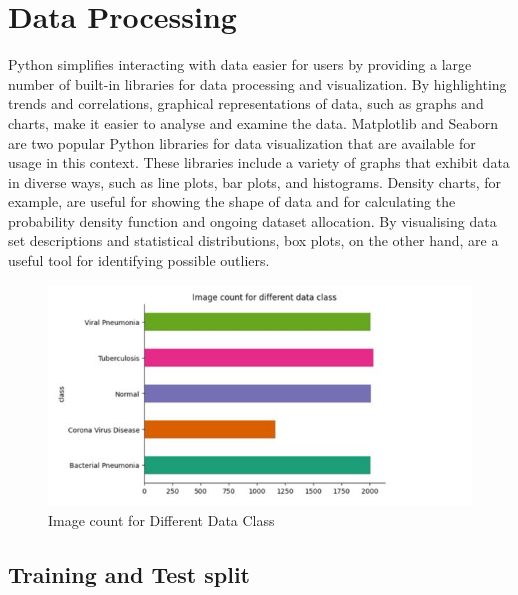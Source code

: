 \section{Data Processing}
Python simplifies interacting with data easier for users by providing a large number of built-in libraries for data processing and visualization. By highlighting trends and correlations, graphical representations of data, such as graphs and charts, make it easier to analyse and examine the data. Matplotlib and Seaborn are two popular Python libraries for data visualization that are available for usage in this context. These libraries include a variety of graphs that exhibit data in diverse ways, such as line plots, bar plots, and histograms. Density charts, for example, are useful for showing the shape of data and for calculating the probability density function and ongoing dataset allocation. By visualising data set descriptions and statistical distributions, box plots, on the other hand, are a useful tool for identifying possible outliers. 
\begin{figure}[ht]
    \centering
    \includegraphics[scale=0.5]{figures/graph.jpg}
    \caption{Image count for Different Data Class}
    \label{fig:chart_a}
\end{figure}

\subsection{Training and Test split}

